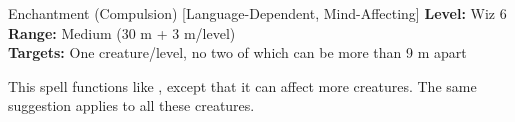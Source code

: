 {Enchantment (Compulsion) [Language-Dependent, Mind-Affecting]}
{
	\textbf{Level:}
	Wiz 6\\
	\textbf{Range:}
	Medium (30 m + 3 m/level)\\
	\textbf{Targets:}
	One creature/level, no two of which can be more than 9 m apart\\
}
{
	This spell functions like , except that it can affect more creatures. The same suggestion applies to all these creatures.

}
